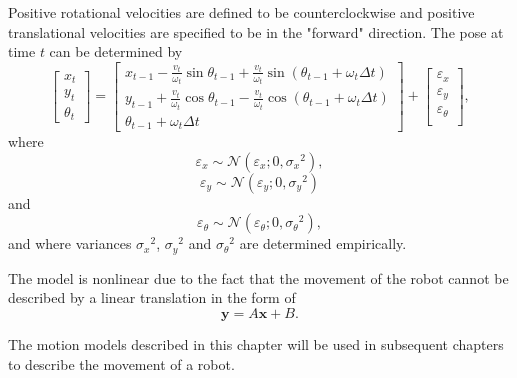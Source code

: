\documentclass[12pt,oneside,openany,a4paper, %
afrikaans,english,
]{memoir}
\numberwithin{equation}{chapter}
\begin{document}
Positive rotational velocities are defined to be counterclockwise and positive translational velocities are specified to be in the "forward" direction.
The pose at time $t$ can be determined by
\begin{equation}
\begin{bmatrix}
x_t\\
y_t\\
\theta_t
\end{bmatrix}
=
\begin{bmatrix}
x_{t-1} - \frac{v_t}{\omega_t} \sin\theta_{t-1} + \frac{v_t}{\omega_t} \sin(\theta_{t-1} + \omega_t \Delta t)\\
y_{t-1} + \frac{v_t}{\omega_t} \cos\theta_{t-1} - \frac{v_t}{\omega_t} \cos(\theta_{t-1} + \omega_t \Delta t)\\
\theta_{t-1} + \omega_t \Delta t
\end{bmatrix}+
\begin{bmatrix}
\varepsilon_x\\
\varepsilon_y\\
\varepsilon_\theta\\
\end{bmatrix},
\end{equation}
where
\begin{equation}
\varepsilon_x \sim \mathcal{N}(\varepsilon_x; 0, {\sigma_x}^2),
\end{equation}
\begin{equation}
\varepsilon_y \sim \mathcal{N}(\varepsilon_y; 0, {\sigma_y}^2)
\end{equation}
and
\begin{equation}
\varepsilon_\theta \sim \mathcal{N}(\varepsilon_\theta; 0, {\sigma_\theta}^2),
\end{equation}
and where variances ${\sigma_x}^2$, ${\sigma_y}^2$ and ${\sigma_\theta}^2$ are determined empirically.

The model is nonlinear due to the fact that the movement of the robot cannot be described by a linear translation in the form of
\begin{equation}
\bm{y} = A\bm{x} + B.
\end{equation}

The motion models described in this chapter will be used in subsequent chapters to describe the movement of a robot.
\end{document}
